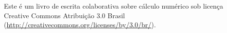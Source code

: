 Este é um livro de escrita colaborativa sobre cálculo numérico sob licença Creative Commons Atribuição 3.0 Brasil (\url{http://creativecommons.org/licenses/by/3.0/br/}).